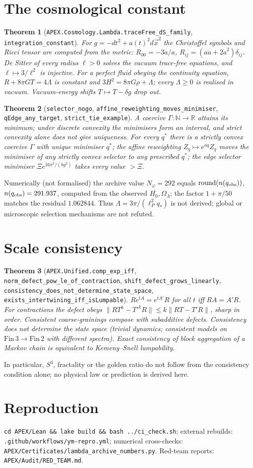 \documentclass[11pt]{article}
\newtheorem{theorem}{Theorem}
\theoremstyle{remark}\newtheorem{remark}[theorem]{Remark}
\begin{document}
\section{The cosmological constant}
\begin{theorem}[\texttt{APEX.Cosmology.Lambda.traceFree\_dS\_family}, \texttt{integration\_constant}]
For $g=-dt^2+a(t)^2d\vec x^2$ the Christoffel symbols and Ricci tensor are computed from the metric: $R_{00}=-3\ddot a/a$, $R_{ij}=(a\ddot a+2\dot a^2)\delta_{ij}$. De Sitter of every radius $\ell>0$ solves the vacuum trace-free equations, and $\ell\mapsto3/\ell^2$ is injective. For a perfect fluid obeying the continuity equation, $R+8\pi GT=4\Lambda$ is constant and $3H^2=8\pi G\rho+\Lambda$; every $\Lambda\ge0$ is realised in vacuum. Vacuum-energy shifts $T\mapsto T-\delta g$ drop out.
\end{theorem}
\begin{theorem}[\texttt{selector\_nogo}, \texttt{affine\_reweighting\_moves\_minimiser}, \texttt{qEdge\_any\_target}, \texttt{strict\_tie\_example}]
A coercive $\Gamma:\mathbb N\to\mathbb R$ attains its minimum; under discrete convexity the minimisers form an interval, and strict convexity alone does not give uniqueness. For every $q^*$ there is a strictly convex coercive $\Gamma$ with unique minimiser $q^*$; the affine reweighting $Z_q\mapsto e^{aq}Z_q$ moves the minimiser of any strictly convex selector to any prescribed $q^*$; the edge selector minimiser $\Xi e^{16\pi^2/(bg^2)}$ takes every value $>\Xi$.
\end{theorem}
Numerically (not formalised) the archive value $N_\varphi=292$ equals $\mathrm{round}(n(q_{\rm obs}))$, $n(q_{\rm obs})=291.937$, computed from the observed $H_0,\Omega_\Lambda$; the factor $1+\pi/50$ matches the residual $1.062844$. Thus $\Lambda=3\pi/(\ell_P^2q_*)$ is not derived; global or microscopic selection mechanisms are not refuted.

\section{Scale consistency}
\begin{theorem}[\texttt{APEX.Unified.comp\_exp\_iff}, \texttt{norm\_defect\_pow\_le\_of\_contraction}, \texttt{shift\_defect\_grows\_linearly}, \texttt{consistency\_does\_not\_determine\_state\_space}, \texttt{exists\_intertwining\_iff\_isLumpable}]
$R e^{tA}=e^{tA'}R$ for all $t$ iff $RA=A'R$. For contractions the defect obeys $\|RT^k-T'^kR\|\le k\|RT-T'R\|$, sharp in order. Consistent coarse-grainings compose with subadditive defects. Consistency does not determine the state space (trivial dynamics; consistent models on $\mathrm{Fin}\,3\to\mathrm{Fin}\,2$ with different spectra). Exact consistency of block aggregation of a Markov chain is equivalent to Kemeny--Snell lumpability.
\end{theorem}
In particular, $S^3$, fractality or the golden ratio do not follow from the consistency condition alone; no physical law or prediction is derived here.

\section*{Reproduction}
\texttt{cd APEX/Lean \&\& lake build \&\& bash ../ci\_check.sh}; external rebuilds: \texttt{.github/workflows/ym-repro.yml}; numerical cross-checks: \texttt{APEX/Certificates/lambda\_archive\_numbers.py}. Red-team reports: \texttt{APEX/Audit/RED\_TEAM.md}.
\end{document}
